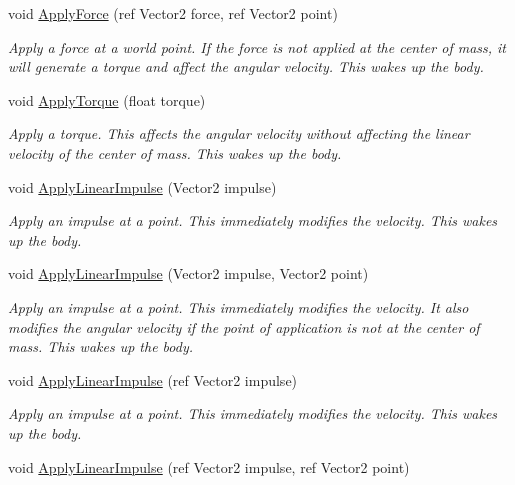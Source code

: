 \begin{DoxyCompactItemize}
void \hyperlink{class_farseer_physics_1_1_dynamics_1_1_body_a68f285bf947cb2a88671f4dc78e19993}{Apply\+Force} (ref Vector2 force, ref Vector2 point)
\begin{DoxyCompactList}\small\item\em Apply a force at a world point. If the force is not applied at the center of mass, it will generate a torque and affect the angular velocity. This wakes up the body. \end{DoxyCompactList}\item 
void \hyperlink{class_farseer_physics_1_1_dynamics_1_1_body_aefe7571d4badcb1120136ef6162d1aa7}{Apply\+Torque} (float torque)
\begin{DoxyCompactList}\small\item\em Apply a torque. This affects the angular velocity without affecting the linear velocity of the center of mass. This wakes up the body. \end{DoxyCompactList}\item 
void \hyperlink{class_farseer_physics_1_1_dynamics_1_1_body_a1619df958def618eaa84404a0c51f6fc}{Apply\+Linear\+Impulse} (Vector2 impulse)
\begin{DoxyCompactList}\small\item\em Apply an impulse at a point. This immediately modifies the velocity. This wakes up the body. \end{DoxyCompactList}\item 
void \hyperlink{class_farseer_physics_1_1_dynamics_1_1_body_ad4c3c4b3abeea87dc076bd5c77a5664e}{Apply\+Linear\+Impulse} (Vector2 impulse, Vector2 point)
\begin{DoxyCompactList}\small\item\em Apply an impulse at a point. This immediately modifies the velocity. It also modifies the angular velocity if the point of application is not at the center of mass. This wakes up the body. \end{DoxyCompactList}\item 
void \hyperlink{class_farseer_physics_1_1_dynamics_1_1_body_ac876628bf3a5052a945f9051c5e04c7f}{Apply\+Linear\+Impulse} (ref Vector2 impulse)
\begin{DoxyCompactList}\small\item\em Apply an impulse at a point. This immediately modifies the velocity. This wakes up the body. \end{DoxyCompactList}\item 
void \hyperlink{class_farseer_physics_1_1_dynamics_1_1_body_a717217f1389379768f67beafbc86dd11}{Apply\+Linear\+Impulse} (ref Vector2 impulse, ref Vector2 point)

\end{DoxyCompactItemize}
